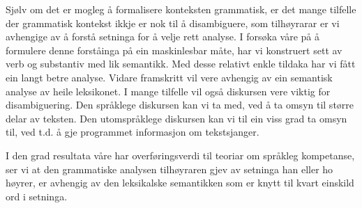 \documentclass[a4paper,nynorsk]{article}
\begin{document}
Sjølv om det er mogleg å formalisere konteksten grammatisk, er det mange tilfelle der grammatisk kontekst ikkje er nok til å disambiguere, som tilhøyrarar er vi avhengige av å forstå setninga for å velje rett analyse. I forsøka våre på å formulere denne forståinga på ein maskinlesbar måte, har vi konstruert sett av verb og substantiv med lik semantikk. Med desse relativt enkle tildaka har vi fått ein langt betre analyse. Vidare framskritt vil vere avhengig av ein semantisk analyse av heile leksikonet. I mange tilfelle vil også diskursen vere viktig for disambiguering. Den språklege diskursen kan vi ta med, ved å ta omsyn til større delar av teksten. Den utomspråklege diskursen kan vi til ein viss grad ta omsyn til, ved t.d. å gje programmet informasjon om tekstsjanger. %

I den grad resultata våre har overføringsverdi til teoriar om språkleg kompetanse, ser vi at den grammatiske analysen tilhøyraren gjev av setninga han eller ho høyrer, er avhengig av den leksikalske semantikken som er knytt til kvart einskild ord i setninga. %




%
\end{document}
